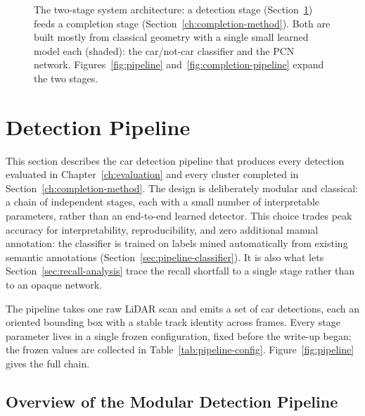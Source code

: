 \begin{figure}[H]
  \caption[System architecture]{The two-stage system architecture: a detection stage
    (Section~\ref{sec:meth-detection}) feeds a completion stage
    (Section~\ref{ch:completion-method}). Both are built mostly from classical geometry with
    a single small learned model each (shaded): the car/not-car classifier and the PCN
    network. Figures~\ref{fig:pipeline} and~\ref{fig:completion-pipeline} expand the two
    stages.}
  \label{fig:architecture}
\end{figure}

\section{Detection Pipeline}
\label{sec:meth-detection}

This section describes the car detection pipeline that produces every detection
evaluated in Chapter~\ref{ch:evaluation} and every cluster completed in
Section~\ref{ch:completion-method}. The
design is deliberately modular and classical: a chain of independent stages,
each with a small number of interpretable parameters, rather than an end-to-end
learned detector. This choice trades peak accuracy for interpretability,
reproducibility, and zero additional manual annotation: the classifier is trained on
labels mined automatically from existing semantic annotations
(Section~\ref{sec:pipeline-classifier}). It is also what lets Section~\ref{sec:recall-analysis}
trace the recall shortfall to a single stage rather than to an opaque
network.

The pipeline takes one raw LiDAR scan and emits a set of car detections, each an
oriented bounding box with a stable track identity across frames. Every stage
parameter lives in a single frozen configuration, fixed before the write-up began; the frozen
values are collected in Table~\ref{tab:pipeline-config}. Figure~\ref{fig:pipeline}
gives the full chain.

\subsection{Overview of the Modular Detection Pipeline}
\label{sec:pipeline-overview}

